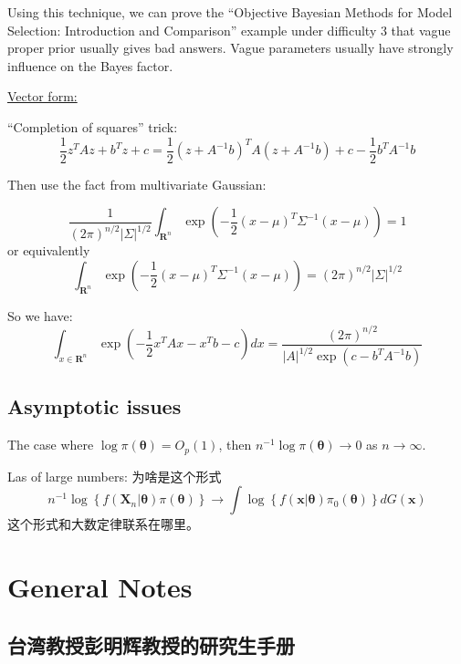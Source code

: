 \documentclass[
]{book}
\theoremstyle{definition}
\theoremstyle{definition}
\theoremstyle{definition}
\theoremstyle{remark}
\begin{document}
Using this technique, we can prove the ``Objective Bayesian Methods for Model Selection: Introduction and Comparison'' example under difficulty 3 that vague proper prior usually gives bad answers. Vague parameters usually have strongly influence on the Bayes factor.

\href{http://cs229.stanford.edu/section/more_on_gaussians.pdf}{Vector form:}

``Completion of squares'' trick:
\[
\frac{1}{2} z^{T} A z+b^{T} z+c=\frac{1}{2}\left(z+A^{-1} b\right)^{T} A\left(z+A^{-1} b\right)+c-\frac{1}{2} b^{T} A^{-1} b
\]

Then use the fact from multivariate Gaussian:

\[
\frac{1}{(2 \pi)^{n / 2}|\Sigma|^{1 / 2}} \int_{\mathbf{R}^{n}} \exp \left(-\frac{1}{2}(x-\mu)^{T} \Sigma^{-1}(x-\mu)\right)=1
\]
or equivalently
\[
\int_{\mathbf{R}^{n}} \exp \left(-\frac{1}{2}(x-\mu)^{T} \Sigma^{-1}(x-\mu)\right)=(2 \pi)^{n / 2}|\Sigma|^{1 / 2}
\]

So we have:
\[
\int_{x \in \mathbf{R}^{n}} \exp \left(-\frac{1}{2} x^{T} A x-x^{T} b-c\right) d x=\frac{(2 \pi)^{n / 2}}{|A|^{1 / 2} \exp \left(c-b^{T} A^{-1} b\right)}
\]

\hypertarget{asymptotic-issues}{%
\section{Asymptotic issues}\label{asymptotic-issues}}

The case where \(\log \pi(\boldsymbol{\theta})=O_{p}(1)\), then \(n^{-1} \log \pi(\boldsymbol{\theta}) \rightarrow 0\) as \(n\rightarrow \infty\).

Las of large numbers: 为啥是这个形式
\[
n^{-1} \log \left\{f\left(\boldsymbol{X}_{n} | \boldsymbol{\theta}\right) \pi(\boldsymbol{\theta})\right\} \rightarrow \int \log \left\{f(\boldsymbol{x} | \boldsymbol{\theta}) \pi_{0}(\boldsymbol{\theta})\right\} d G(\boldsymbol{x})
\]
这个形式和大数定律联系在哪里。

\hypertarget{general-notes}{%
\chapter{General Notes}\label{general-notes}}

\hypertarget{ux53f0ux6e7eux6559ux6388ux5f6dux660eux8f89ux6559ux6388ux7684ux7814ux7a76ux751fux624bux518c}{%
\section{台湾教授彭明辉教授的研究生手册}\label{ux53f0ux6e7eux6559ux6388ux5f6dux660eux8f89ux6559ux6388ux7684ux7814ux7a76ux751fux624bux518c}}
\end{document}
